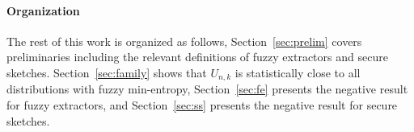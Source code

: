 \paragraph{Organization} The rest of this work is organized as follows, Section~\ref{sec:prelim} covers preliminaries including the relevant definitions of fuzzy extractors and secure sketches.  Section~\ref{sec:family} shows that $U_{n,k}$ is statistically close to all distributions with fuzzy min-entropy, Section~\ref{sec:fe} presents the negative result for fuzzy extractors, and Section~\ref{sec:ss} presents the negative result for secure sketches.